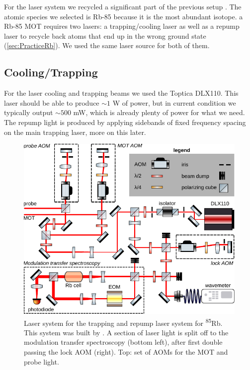 For the laser system we recycled a significant part of the previous setup \cite{Reijnders2010}.
The atomic species we selected is Rb-85 because it is the most abundant isotope. 
a Rb-85 MOT requires two lasers: a trapping/cooling laser as well as a repump laser to recycle back atoms that end up in the wrong ground state (\cref{sec:PracticeRb}).
We used the same laser source for both of them. 

\subsection{Cooling/Trapping}

For the laser cooling and trapping beams we used the Toptica DLX110.
This laser should be able to produce $\sim 1$ W of power, but in current condition we typically output $\sim 500$ mW, which is already plenty of power for what we need. 
The repump light is produced by applying sidebands of fixed frequency spacing on the main trapping laser, more on this later.

\begin{figure}[t]
    \centering
    \includegraphics[width=\linewidth]{figures/RbLaserSetup.pdf}
    \caption{Laser system for the trapping and repump laser system for \textsuperscript{85}Rb.
    This system was built by \cite{Reijnders2010}.
    A section of laser light is split off to the modulation transfer spectroscopy (bottom left), after first double passing the lock \ac{AOM} (right). 
    Top: set of AOMs for the MOT and probe light.
    }
    \label{fig:RbLaserSetup}
\end{figure}

